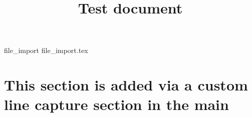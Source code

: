 \documentclass[]{memoir}
\title{Test document}
\newcommand\customlatexfileread[1]{}
\newcommand\customseccommand[1]{\section{#1}}
\begin{document}
\maketitle




{file_import}
{file_import.tex}


\customlatexfileread{custom_input}

\customseccommand{This section is added via a custom line capture section in the main } 

\end{document}
